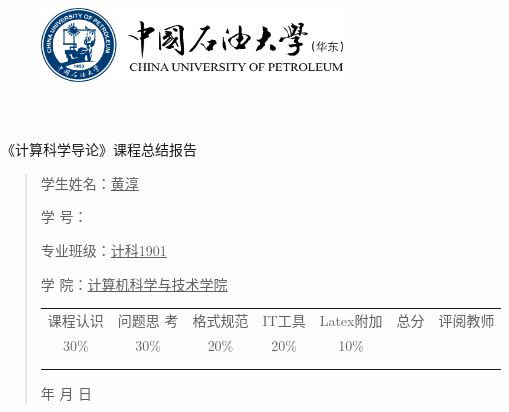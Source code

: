 \documentclass{article}
\renewcommand{\today}{\number\year 年 \number\month 月 \number\day 日}
\begin{document}
\begin{figure}
    \centering
    \includegraphics[width=8cm]{upc.png}

    \label{figupc}
\end{figure}

	\begin{center}
		\quad \\
		\quad \\
		\heiti \fontsize{45}{17} \quad \quad \quad 
		\vskip 1.5cm
		\heiti {} 《计算科学导论》课程总结报告
	\end{center}
	\vskip 2.0cm
		
	\begin{quotation}
		\doublespacing
		
        \par\setlength\parindent{7em}
		\quad 

		学生姓名：\underline{\qquad  黄淳 \qquad \qquad}

		学\hspace{0.61cm} 号：\underline{\qquad}
		
		专业班级：\underline{\qquad 计科1901 \qquad  }
		
        学\hspace{0.61cm} 院：\underline{计算机科学与技术学院}
		\vskip 2cm
		\centering
		\begin{table}[h]
            \centering 
            \begin{tabular}{|c|c|c|c|c|c|c|}
                \hline
                课程认识 & 问题思 考 & 格式规范  & IT工具  & Latex附加  & 总分 & 评阅教师 \\
                30\% & 30\% & 20\% & 20\% & 10\% &  &  \\
                \hline
                 & & & & & &\\
                & & & & & &\\
                \hline
            \end{tabular}
        \end{table}
		\vskip 2cm
		\today
	\end{quotation}
\end{document}
